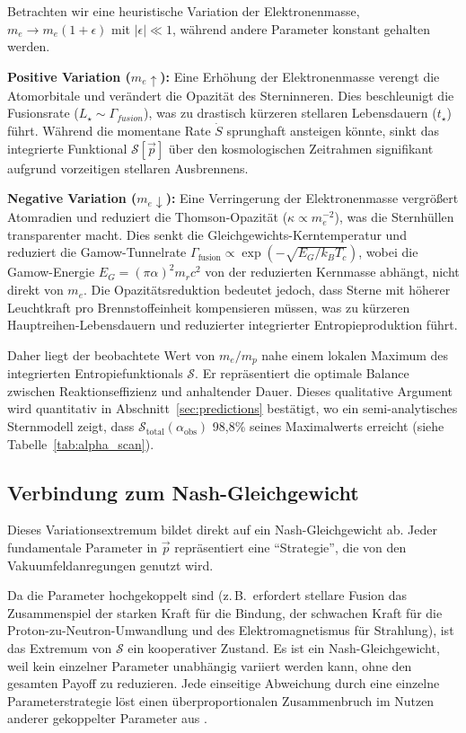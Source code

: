 \documentclass[12pt,a4paper]{article}
\theoremstyle{remark}
\begin{document}
Betrachten wir eine heuristische Variation der Elektronenmasse, $m_e \to m_e(1+\epsilon)$ mit $|\epsilon| \ll 1$, w\"ahrend andere Parameter konstant gehalten werden.

\textbf{Positive Variation ($m_e \uparrow$):} Eine Erh\"ohung der Elektronenmasse verengt die Atomorbitale und ver\"andert die Opazit\"at des Sterninneren. Dies beschleunigt die Fusionsrate ($L_\star \sim \Gamma_{fusion}$), was zu drastisch k\"urzeren stellaren Lebensdauern ($t_\star$) f\"uhrt. W\"ahrend die momentane Rate $\dot{S}$ sprunghaft ansteigen k\"onnte, sinkt das integrierte Funktional $\mathcal{S}[\vec{p}]$ \"uber den kosmologischen Zeitrahmen signifikant aufgrund vorzeitigen stellaren Ausbrennens.

\textbf{Negative Variation ($m_e \downarrow$):} Eine Verringerung der Elektronenmasse vergr\"o\ss{}ert Atomradien und reduziert die Thomson-Opazit\"at ($\kappa \propto m_e^{-2}$), was die Sternh\"ullen transparenter macht. Dies senkt die Gleichgewichts-Kerntemperatur und reduziert die Gamow-Tunnelrate $\Gamma_{\text{fusion}} \propto \exp(-\sqrt{E_G / k_B T_c})$, wobei die Gamow-Energie $E_G = (\pi \alpha)^2 m_r c^2$ von der reduzierten Kernmasse abh\"angt, nicht direkt von $m_e$. Die Opazit\"atsreduktion bedeutet jedoch, dass Sterne mit h\"oherer Leuchtkraft pro Brennstoffeinheit kompensieren m\"ussen, was zu k\"urzeren Hauptreihen-Lebensdauern und reduzierter integrierter Entropieproduktion f\"uhrt.

Daher liegt der beobachtete Wert von $m_e/m_p$ nahe einem lokalen Maximum des integrierten Entropiefunktionals $\mathcal{S}$. Er repr\"asentiert die optimale Balance zwischen Reaktionseffizienz und anhaltender Dauer. Dieses qualitative Argument wird quantitativ in Abschnitt~\ref{sec:predictions} best\"atigt, wo ein semi-analytisches Sternmodell zeigt, dass $\mathcal{S}_{\text{total}}(\alpha_{\text{obs}})$ 98,8\% seines Maximalwerts erreicht (siehe Tabelle~\ref{tab:alpha_scan}).

\subsection{Verbindung zum Nash-Gleichgewicht}

Dieses Variationsextremum bildet direkt auf ein Nash-Gleichgewicht ab. Jeder fundamentale Parameter in $\vec{p}$ repr\"asentiert eine ``Strategie'', die von den Vakuumfeldanregungen genutzt wird.

Da die Parameter hochgekoppelt sind (z.\,B.\ erfordert stellare Fusion das Zusammenspiel der starken Kraft f\"ur die Bindung, der schwachen Kraft f\"ur die Proton-zu-Neutron-Umwandlung und des Elektromagnetismus f\"ur Strahlung), ist das Extremum von $\mathcal{S}$ ein kooperativer Zustand. Es ist ein Nash-Gleichgewicht, weil kein einzelner Parameter unabh\"angig variiert werden kann, ohne den gesamten Payoff zu reduzieren. Jede einseitige Abweichung durch eine einzelne Parameterstrategie l\"ost einen \"uberproportionalen Zusammenbruch im Nutzen anderer gekoppelter Parameter aus \citep{Adams2019}.
\end{document}
